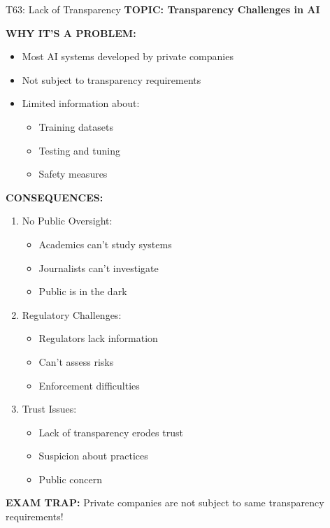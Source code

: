 \documentclass[8pt]{beamer}
\begin{document}
	\begin{frame}{T63: Lack of Transparency}
		\fontsize{6.5}{7.5}\selectfont
		\textbf{TOPIC: Transparency Challenges in AI}
		
		\vspace{0.1cm}
		\textbf{WHY IT'S A PROBLEM:}
		\begin{itemize}
			\item Most AI systems developed by private companies
			\item Not subject to transparency requirements
			\item Limited information about:
			\begin{itemize}
				\item Training datasets
				\item Testing and tuning
				\item Safety measures
			\end{itemize}
		\end{itemize}
		
		\vspace{0.1cm}
		\textbf{CONSEQUENCES:}
		\begin{enumerate}
			\item \textcolor{myblue}{No Public Oversight:}
			\begin{itemize}
				\item Academics can't study systems
				\item Journalists can't investigate
				\item Public is in the dark
			\end{itemize}
			\item \textcolor{myblue}{Regulatory Challenges:}
			\begin{itemize}
				\item Regulators lack information
				\item Can't assess risks
				\item Enforcement difficulties
			\end{itemize}
			\item \textcolor{myblue}{Trust Issues:}
			\begin{itemize}
				\item Lack of transparency erodes trust
				\item Suspicion about practices
				\item Public concern
			\end{itemize}
		\end{enumerate}
		
		\textcolor{myred}{\textbf{EXAM TRAP:}} Private companies are \textcolor{myblue}{not subject to same transparency requirements}!
	\end{frame}
	
\end{document}

